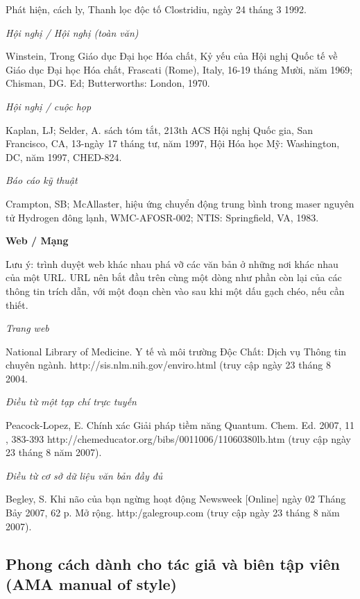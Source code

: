 \documentclass{hcmutarticle}
\begin{document}
 Phát hiện, cách ly, Thanh lọc độc tố Clostridiu, ngày 24 tháng 3 1992.

{\em Hội nghị / Hội nghị (toàn văn)}

Winstein, Trong Giáo dục Đại học Hóa chất, Kỷ yếu của Hội nghị Quốc tế về Giáo dục Đại học Hóa chất, Frascati (Rome), Italy, 16-19 tháng Mười, năm 1969; Chisman, DG. Ed; Butterworths: London, 1970.

{\em Hội nghị / cuộc họp }

Kaplan, LJ; Selder, A. sách tóm tắt, 213th ACS Hội nghị Quốc gia, San Francisco, CA, 13-ngày 17 tháng tư, năm 1997, Hội Hóa học Mỹ: Washington, DC, năm 1997, CHED-824.

{\em Báo cáo kỹ thuật }

Crampton, SB; McAllaster, hiệu ứng chuyển động trung bình trong maser nguyên tử Hydrogen đông lạnh, WMC-AFOSR-002; NTIS: Springfield, VA, 1983.

{\bfseries Web / Mạng}

Lưu ý: trình duyệt web khác nhau phá vỡ các văn bản ở những nơi khác nhau của một URL. URL nên bắt đầu trên cùng một dòng như phần còn lại của các thông tin trích dẫn, với một đoạn chèn vào sau khi một dấu gạch chéo, nếu cần thiết.

{\em Trang web}

National Library of Medicine. Y tế và môi trường Độc Chất: Dịch vụ Thông tin chuyên ngành. http://sis.nlm.nih.gov/enviro.html (truy cập ngày 23 tháng 8 2004.

{\em Điều từ một tạp chí trực tuyến}

Peacock-Lopez, E. Chính xác Giải pháp tiềm năng Quantum. Chem. Ed. 2007, 11 , 383-393 http://chemeducator.org/bibs/0011006/11060380lb.htm (truy cập ngày 23 tháng 8 năm 2007).

{\em Điều từ cơ sở dữ liệu văn bản đầy đủ}

Begley, S. Khi não của bạn ngừng hoạt động Newsweek [Online] ngày 02 Tháng Bảy 2007, 62 p. Mở rộng. http:/galegroup.com (truy cập ngày 23 tháng 8 năm 2007).



\subsection{Phong cách dành cho tác giả và biên tập viên (AMA manual of style)}
\end{document}
